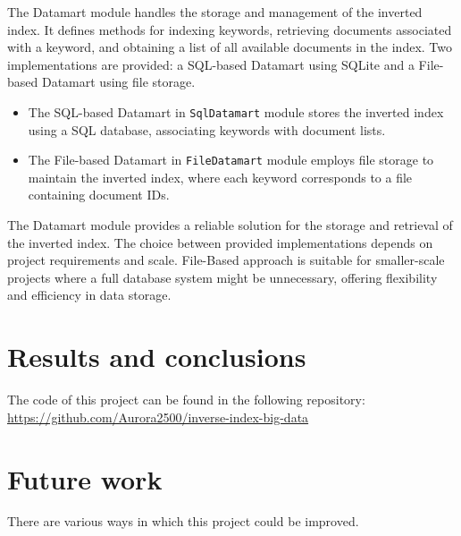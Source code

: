 \documentclass{article}
\begin{document}
The Datamart module handles the storage and management of the inverted index. It defines methods for indexing keywords, retrieving documents associated with a keyword, and obtaining a list of all available documents in the index. Two implementations are provided: a SQL-based Datamart using SQLite and a File-based Datamart using file storage.
\begin{itemize}

\item 
The SQL-based Datamart in \texttt{SqlDatamart} module stores the inverted index using a SQL database, associating keywords with document lists.

\item 
The File-based Datamart in \texttt{FileDatamart} module employs file storage to maintain the inverted index, where each keyword corresponds to a file containing document IDs. 
\end{itemize}
The Datamart module provides a reliable solution for the storage and retrieval of the inverted index. The choice between provided implementations depends on project requirements and scale.
File-Based approach is suitable for smaller-scale projects where a full database system might be unnecessary, offering flexibility and efficiency in data storage.

\section{Results and conclusions}


The code of this project can be found in the following repository: \url{https://github.com/Aurora2500/inverse-index-big-data}

\section{Future work}

There are various ways in which this project could be improved.
\end{document}
